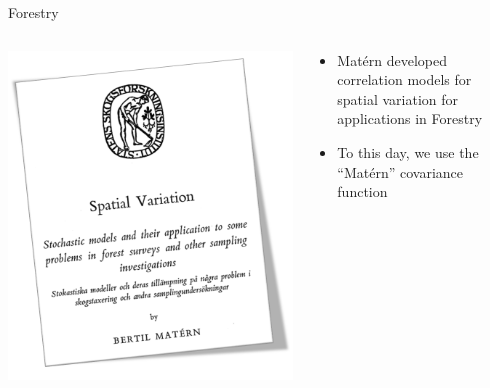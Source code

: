 \documentclass[
  ignorenonframetext,
]{beamer}
\providecommand{\tightlist}{%
  \setlength{\itemsep}{0pt}\setlength{\parskip}{0pt}}\usepackage{longtable,booktabs,array}
\begin{document}
\begin{frame}{Forestry}
\label{forestry}
\begin{columns}[T]
\begin{column}{0.5\textwidth}
\includegraphics{../../presentations/20240222_UNC_ESE_Guest_Lecture/matern.png}
\end{column}

\begin{column}{0.5\textwidth}
\begin{itemize}
\tightlist
\item
  Matérn developed correlation models for spatial variation for
  applications in Forestry
\item
  To this day, we use the ``Matérn'' covariance function
\end{itemize}
\end{column}
\end{columns}
\end{frame}
\end{document}
